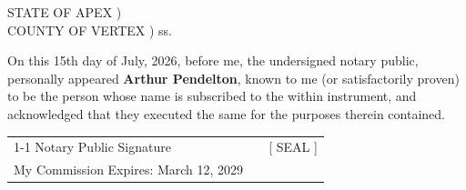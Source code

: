 \documentclass[10pt,letterpaper]{article}
\begin{document}
\begin{tcolorbox}[
    title={7. NOTARY PUBLIC ACKNOWLEDGMENT},
    colback=lightbg,
    colframe=accentcolor,
    coltitle=primarycolor,
    before=\noindent,
    after=\vspace{8pt}
]
\small
STATE OF APEX \hfill) \\
COUNTY OF VERTEX \hfill) ss.
\vspace{8pt}

On this 15th day of July, 2026, before me, the undersigned notary public, personally appeared \textbf{Arthur Pendelton}, known to me (or satisfactorily proven) to be the person whose name is subscribed to the within instrument, and acknowledged that they executed the same for the purposes therein contained.
\vspace{25pt}

\begin{tabularx}{\textwidth}{@{} X p{2cm} c @{}}
    \cline{1-1} \cline{3-3}
    Notary Public Signature & & [ SEAL ] \\
    My Commission Expires: March 12, 2029 & & \\
\end{tabularx}
\end{tcolorbox}
\end{document}
